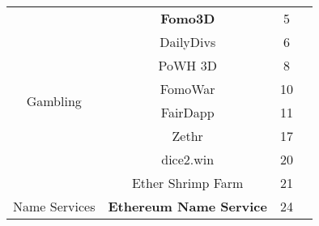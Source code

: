 \begin{table}[t]
\begin{tabular}{|c|c|c|l|}
					
\multirow{8}{*}{Gambling}										& \cellcolor{LightGrey} \textbf{Fomo3D} & 5 \\  
															& DailyDivs & 6 \\													& PoWH 3D & 8	 \\ 
															& FomoWar & 10 \\
															& FairDapp & 11\\
															& Zethr & 17 \\
															& dice2.win & 20 \\ 
															& Ether Shrimp Farm & 21 \\  \hline	

							
\multirow{1}{*}{Name Services}									& \cellcolor{LightGrey} \textbf{Ethereum Name Service} & 24  \\  \hline	


\end{tabular}
\vspace{1em}
\end{table}

